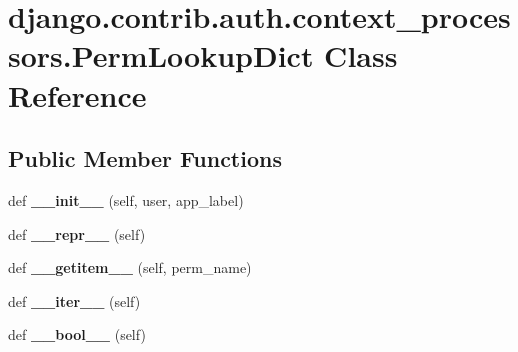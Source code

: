 \hypertarget{classdjango_1_1contrib_1_1auth_1_1context__processors_1_1_perm_lookup_dict}{}\section{django.\+contrib.\+auth.\+context\+\_\+processors.\+Perm\+Lookup\+Dict Class Reference}
\label{classdjango_1_1contrib_1_1auth_1_1context__processors_1_1_perm_lookup_dict}
\subsection*{Public Member Functions}
\begin{DoxyCompactItemize}
\item 
\mbox{\label{classdjango_1_1contrib_1_1auth_1_1context__processors_1_1_perm_lookup_dict_a6c36eb25b4b923374f8f287983d7c674}} 
def {\bfseries \+\_\+\+\_\+init\+\_\+\+\_\+} (self, user, app\+\_\+label)
\item 
\mbox{\label{classdjango_1_1contrib_1_1auth_1_1context__processors_1_1_perm_lookup_dict_a92a6ebbc8e8c273dc41ce83d6bb8283b}} 
def {\bfseries \+\_\+\+\_\+repr\+\_\+\+\_\+} (self)
\item 
\mbox{\label{classdjango_1_1contrib_1_1auth_1_1context__processors_1_1_perm_lookup_dict_a3a10930e8fd9aaf1ca9d63707f938128}} 
def {\bfseries \+\_\+\+\_\+getitem\+\_\+\+\_\+} (self, perm\+\_\+name)
\item 
\mbox{\label{classdjango_1_1contrib_1_1auth_1_1context__processors_1_1_perm_lookup_dict_ad1215bf94030bdc0550dc31165a6f615}} 
def {\bfseries \+\_\+\+\_\+iter\+\_\+\+\_\+} (self)
\item 
\mbox{\label{classdjango_1_1contrib_1_1auth_1_1context__processors_1_1_perm_lookup_dict_a527b65a82adf26db78e5abfb5c11ab3e}} 
def {\bfseries \+\_\+\+\_\+bool\+\_\+\+\_\+} (self)
\end{DoxyCompactItemize}
